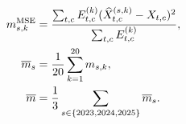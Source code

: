 \begin{equation}
 \begin{split}
 m_{s,k}^{\rm MSE}&=\frac{\sum_{t,c}E_{t,c}^{(k)}
                  (\widehat X^{(s,k)}_{t,c}-X_{t,c})^2}
                  {\sum_{t,c}E_{t,c}^{(k)}},\\
 \overline m_s&=\frac1{20}\sum_{k=1}^{20}m_{s,k},\\
 \overline m&=\frac13\sum_{s\in\{2023,2024,2025\}}\overline m_s.
 \end{split}\label{eq:metrics}
\end{equation}
